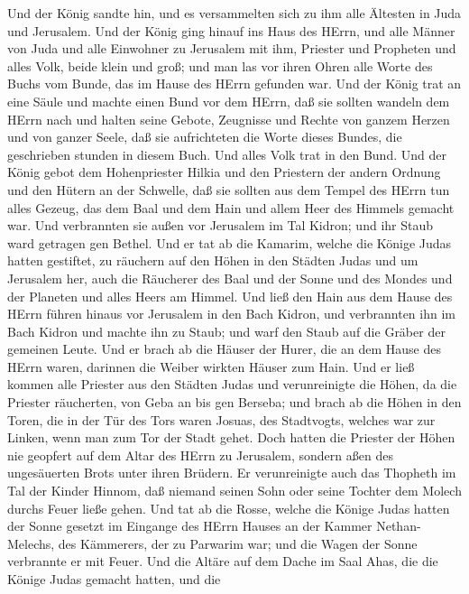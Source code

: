  Und der König sandte hin, und es versammelten sich zu ihm
alle Ältesten in Juda und Jerusalem.  Und der König ging
hinauf ins Haus des HErrn, und alle Männer von Juda und alle Einwohner
zu Jerusalem mit ihm, Priester und Propheten und alles Volk, beide klein
und groß; und man las vor ihren Ohren alle Worte des Buchs vom Bunde,
das im Hause des HErrn gefunden war.  Und der König trat an
eine Säule und machte einen Bund vor dem HErrn, daß sie sollten wandeln
dem HErrn nach und halten seine Gebote, Zeugnisse und Rechte von ganzem
Herzen und von ganzer Seele, daß sie aufrichteten die Worte dieses
Bundes, die geschrieben stunden in diesem Buch. Und alles Volk trat in
den Bund.  Und der König gebot dem Hohenpriester Hilkia und
den Priestern der andern Ordnung und den Hütern an der Schwelle, daß sie
sollten aus dem Tempel des HErrn tun alles Gezeug, das dem Baal und dem
Hain und allem Heer des Himmels gemacht war. Und verbrannten sie außen
vor Jerusalem im Tal Kidron; und ihr Staub ward getragen gen Bethel.
 Und er tat ab die Kamarim, welche die Könige Judas hatten
gestiftet, zu räuchern auf den Höhen in den Städten Judas und um
Jerusalem her, auch die Räucherer des Baal und der Sonne und des Mondes
und der Planeten und alles Heers am Himmel.  Und ließ den
Hain aus dem Hause des HErrn führen hinaus vor Jerusalem in den Bach
Kidron, und verbrannten ihn im Bach Kidron und machte ihn zu Staub; und
warf den Staub auf die Gräber der gemeinen Leute.  Und er
brach ab die Häuser der Hurer, die an dem Hause des HErrn waren,
darinnen die Weiber wirkten Häuser zum Hain.  Und er ließ
kommen alle Priester aus den Städten Judas und verunreinigte die Höhen,
da die Priester räucherten, von Geba an bis gen Berseba; und brach ab
die Höhen in den Toren, die in der Tür des Tors waren Josuas, des
Stadtvogts, welches war zur Linken, wenn man zum Tor der Stadt gehet.
 Doch hatten die Priester der Höhen nie geopfert auf dem
Altar des HErrn zu Jerusalem, sondern aßen des ungesäuerten Brots unter
ihren Brüdern.  Er verunreinigte auch das Thopheth im Tal
der Kinder Hinnom, daß niemand seinen Sohn oder seine Tochter dem Molech
durchs Feuer ließe gehen.  Und tat ab die Rosse, welche die
Könige Judas hatten der Sonne gesetzt im Eingange des HErrn Hauses an
der Kammer Nethan-Melechs, des Kämmerers, der zu Parwarim war; und die
Wagen der Sonne verbrannte er mit Feuer.  Und die Altäre
auf dem Dache im Saal Ahas, die die Könige Judas gemacht hatten, und die
